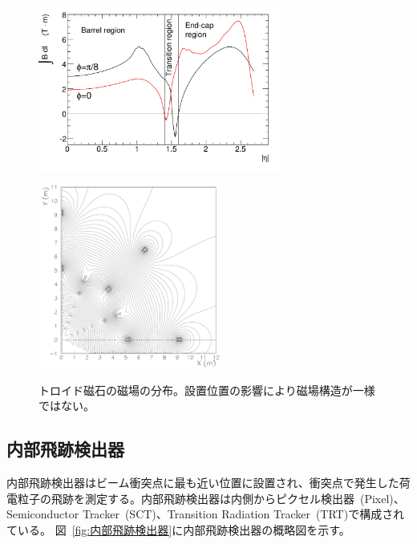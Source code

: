 \begin{figure}
    \centering
    \begin{minipage}[b]{0.5\linewidth}%
        \centering
        \hspace*{-1cm}
        \includegraphics[clip, width=8cm]{fig/2/IBdl.pdf}
        \vspace{10pt}
        \label{fig:磁場eta}
    \end{minipage}%
    \begin{minipage}[b]{0.6\linewidth}%
        \centering
        \includegraphics[clip, width=6cm]{fig/2/FMBmap.pdf}
        \vspace{10pt}
        \label{fig:磁場平面}
    \end{minipage}%
    \caption{トロイド磁石の磁場の分布。設置位置の影響により磁場構造が一様ではない。}
    \label{fig:磁場}
\end{figure}




\subsection{内部飛跡検出器}
内部飛跡検出器はビーム衝突点に最も近い位置に設置され、衝突点で発生した荷電粒子の飛跡を測定する。内部飛跡検出器は内側からピクセル検出器~(Pixel)、Semiconductor Tracker~(SCT)、Transition Radiation Tracker~(TRT)で構成されている。
図~\ref{fig:内部飛跡検出器}に内部飛跡検出器の概略図を示す。


